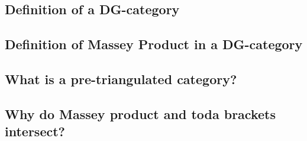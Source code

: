 
\subsection{Definition of a DG-category}


\subsection{Definition of Massey Product in a DG-category}


\subsection{What is a pre-triangulated category?}


\subsection{Why do Massey product and toda brackets intersect?}

